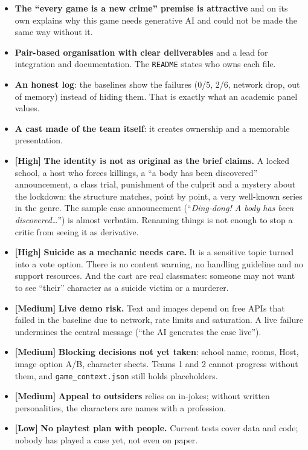 \documentclass[11pt,a4paper]{article}
\newcommand{\file}[1]{\texttt{\small #1}}
\newcommand{\prio}[1]{\textbf{\color{neon}[#1]}}
\begin{document}
\begin{fuerte}
\begin{itemize}
\item \textbf{The ``every game is a new crime'' premise is attractive} and on its own explains why
this game needs generative AI and could not be made the same way without it.
\item \textbf{Pair-based organisation with clear deliverables} and a lead for integration and
documentation. The \file{README} states who owns each file.
\item \textbf{An honest log}: the baselines show the failures (0/5, 2/6, network drop, out of memory)
instead of hiding them. That is exactly what an academic panel values.
\item \textbf{A cast made of the team itself}: it creates ownership and a memorable presentation.
\end{itemize}
\end{fuerte}

\begin{debil}
\begin{itemize}
\item \prio{High} \textbf{The identity is not as original as the brief claims.} A locked school, a
host who forces killings, a ``a body has been discovered'' announcement, a class trial, punishment of
the culprit and a mystery about the lockdown: the structure matches, point by point, a very well-known
series in the genre. The sample case announcement (``\emph{Ding-dong! A body has been
discovered\ldots}'') is almost verbatim. Renaming things is not enough to stop a critic from seeing it
as derivative.
\item \prio{High} \textbf{Suicide as a mechanic needs care.} It is a sensitive topic turned into a
vote option. There is no content warning, no handling guideline and no support resources. And the
cast are real classmates: someone may not want to see ``their'' character as a suicide victim or a
murderer.
\item \prio{Medium} \textbf{Live demo risk.} Text and images depend on free APIs that failed in the
baseline due to network, rate limits and saturation. A live failure undermines the central message
(``the AI generates the case live'').
\item \prio{Medium} \textbf{Blocking decisions not yet taken}: school name, rooms, Host, image option
A/B, character sheets. Teams 1 and 2 cannot progress without them, and \file{game\_context.json}
still holds placeholders.
\item \prio{Medium} \textbf{Appeal to outsiders} relies on in-jokes; without written personalities,
the characters are names with a profession.
\item \prio{Low} \textbf{No playtest plan with people.} Current tests cover data and code; nobody has
played a case yet, not even on paper.
\end{itemize}
\end{debil}
\end{document}

